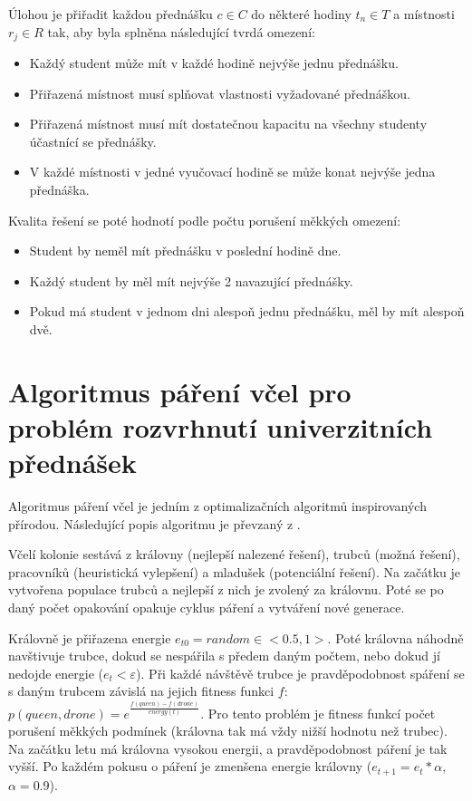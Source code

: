 \documentclass[12pt, a4paper]{article}
\let\epsilon\varepsilon
\begin{document}
Úlohou je přiřadit každou přednášku $c \in C$ do některé hodiny $t_n \in T$ a místnosti $r_j \in R$ tak, aby byla splněna následující tvrdá omezení:
\begin{itemize}
  \item Každý student může mít v každé hodině nejvýše jednu přednášku.
  \item Přiřazená místnost musí splňovat vlastnosti vyžadované přednáškou.
  \item Přiřazená místnost musí mít dostatečnou kapacitu na všechny studenty účastnící se přednášky.
  \item V každé místnosti v jedné vyučovací hodině se může konat nejvýše jedna přednáška.
\end{itemize}
Kvalita řešení se poté hodnotí podle počtu porušení měkkých omezení:
\begin{itemize}
  \item Student by neměl mít přednášku v poslední hodině dne.
  \item Každý student by měl mít nejvýše 2 navazující přednášky.
  \item Pokud má student v jednom dni alespoň jednu přednášku, měl by mít alespoň dvě.
\end{itemize}
\section{Algoritmus páření včel pro problém rozvrhnutí univerzitních přednášek}
Algoritmus páření včel je jedním z optimalizačních algoritmů inspirovaných přírodou.
Následující popis algoritmu je převzaný z \cite{HoneyBee}.

Včelí kolonie sestává z královny (nejlepší nalezené řešení), trubců (možná řešení), pracovníků (heuristická vylepšení)
a mladušek (potenciální řešení).
Na začátku je vytvořena populace trubců a nejlepší z nich je zvolený za královnu.
Poté se po daný počet opakování opakuje cyklus páření a vytváření nové generace.

Královně je přiřazena energie $e_{t0} = random \in <0.5, 1>$.
Poté královna náhodně navštivuje trubce, dokud se nespářila s předem daným počtem, nebo dokud jí nedojde energie ($e_t < \epsilon$).
Při každé návštěvě trubce je prav\-dě\-po\-dob\-nost spáření se s daným trubcem závislá na jejich fitness funkci $f$:
$p(queen, drone) = e^{\frac{f(queen) - f(drone)}{energy(t)}}$.
Pro tento problém je fitness funkcí počet porušení měkkých podmínek (královna tak má vždy nižší hodnotu než trubec).
Na začátku letu má královna vysokou energii, a pravděpodobnost páření je tak vyšší.
Po každém pokusu o páření je zmenšena energie královny ($e_{t+1} = e_{t} * \alpha$, $\alpha = 0.9$).
\end{document}
